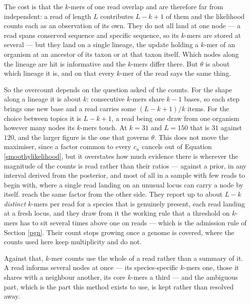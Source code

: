 \documentclass[pdflatex,sn-vancouver-num]{sn-jnl}
\begin{document}
    The cost is that the $k$-mers of one read overlap and are therefore far from independent: a read
    of length $L$ contributes $L - k + 1$ of them and the likelihood counts each as an observation of
    its own. They do not all land at one node --- a read spans conserved sequence and specific
    sequence, so its $k$-mers are stored at several --- but they land on a single lineage, the update
    holding a $k$-mer of an organism at an ancestor of its taxon or at that taxon itself. Which nodes
    along the lineage are hit is informative and the $k$-mers differ there. But $\theta$ is about
    which lineage it is, and on that every $k$-mer of the read says the same thing.

    So the overcount depends on the question asked of the counts. For the shape along a lineage it is
    about $k$: consecutive $k$-mers share $k-1$ bases, so each step brings one new base and a read
    carries some $(L-k+1)/k$ items. For the choice between topics it is $L - k + 1$, a read being one
    draw from one organism however many nodes its $k$-mers touch. At $k = 31$ and $L = 150$ that is
    $31$ against $120$, and the larger figure is the one that governs $\theta$. This does not move the maximiser, since a factor common to every $c_n$
    cancels out of Equation \eqref{smoothylikelihood}, but it overstates how much evidence there is
    wherever the magnitude of the counts is read rather than their ratios --- against a prior, in any
    interval derived from the posterior, and most of all in a sample with few reads to begin with,
    where a single read landing on an unusual locus can carry a node by itself.
    \citet{krakenuniq} reach the same factor from the other side. They report up to about $L - k$
    \emph{distinct} $k$-mers per read for a species that is genuinely present, each read landing at a
    fresh locus, and they draw from it the working rule that a threshold on $k$-mers has to sit
    several times above one on reads --- which is the admission rule of Section \ref{pgn}. Their
    count stops growing once a genome is covered, where the counts used here keep multiplicity and
    do not.

    Against that, $k$-mer counts use the whole of a read rather than a summary of it. A read informs
    several nodes at once --- its species-specific $k$-mers one, those it shares with a neighbour
    another, its core $k$-mers a third --- and the ambiguous part, which is the part this method
    exists to use, is kept rather than resolved away.
\end{document}
